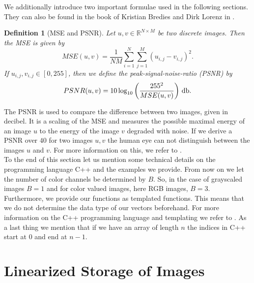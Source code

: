 \documentclass[abstracton]{scrreprt}
\newtheorem{definition}[theorem]{Definition}
\begin{document}
        We additionally introduce two important formulae used in the following sections. They can also be found in the book of Kristian Bredies and Dirk Lorenz in \cite{Bredies}.\newpage
        \begin{definition}[MSE and PSNR]
            Let $u, v \in \mathbb{R}^{N \times M}$ be two discrete images. Then the MSE is given by
                \begin{equation}
                    MSE(u,v) = \frac{1}{NM} \sum_{i = 1}^{N} \sum_{j = 1}^{M} (u_{i,j} - v_{i,j})^{2}.
                    \label{eq:mse}
                \end{equation}
            If $u_{i,j}, v_{i,j} \in [0, 255]$, then we define the peak-signal-noise-ratio (PSNR) by
                \begin{equation}
                    PSNR(u, v) = 10 \log_{10} \left( \frac{255^{2}}{MSE(u,v)} \right)\, \textnormal{db}.
                    \label{eq:psnr}
                \end{equation}
        \end{definition}
        The PSNR is used to compare the difference between two images, given in decibel. It is a scaling of the MSE and measures the possible maximal energy of an image $u$ to the energy of the image $v$ degraded with noise. If we derive a PSNR over $40$ for two images $u,v$ the human eye can not distinguish between the images $u$ and $v$. For more information on this, we refer to \cite{Bredies}.\\
        To the end of this section let us mention some technical details on the programming language C++ and the examples we provide. From now on we let the number of color channels be determined by $B$. So, in the case of grayscaled images $B = 1$ and for color valued images, here RGB images, $B = 3$. Furthermore, we provide our functions as templated functions. This means that we do not determine the data type of our vectors beforehand. For more information on the C++ programming language and templating we refer to \cite{CPlusPlus}. As a last thing we mention that if we have an array of length $n$ the indices in C++ start at $0$ and end at $n-1$.

    \section{Linearized Storage of Images} %
    \label{sec:linearized_storage_of_images}
        
\end{document}
